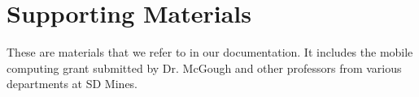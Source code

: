 \chapter{Supporting Materials}
\label{sec:support}

These are materials that we refer to in our documentation. It includes the 
mobile computing grant submitted by Dr. McGough and other professors from 
various departments at SD Mines.


